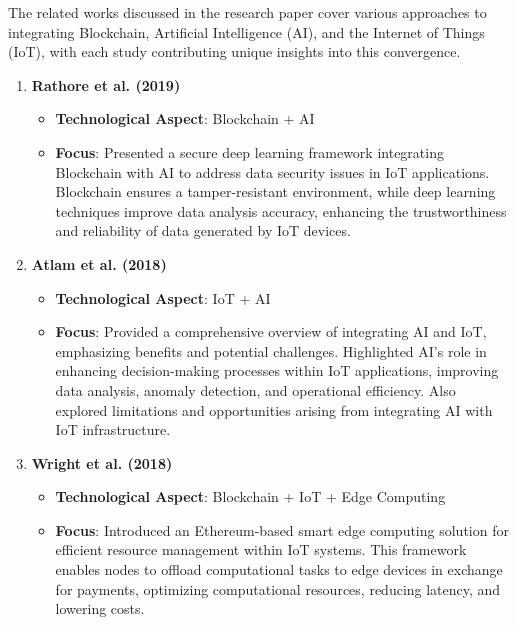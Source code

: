 \documentclass[12pt, oneside]{report}
\begin{document}
The related works discussed in the research paper cover various approaches to integrating Blockchain, Artificial Intelligence (AI), and the Internet of Things (IoT), with each study contributing unique insights into this convergence.

\begin{enumerate}
\item \textbf{Rathore et al. (2019)\cite{rathore2019}}
\begin{itemize}
    \item \textbf{Technological Aspect}: Blockchain + AI
    \item \textbf{Focus}: Presented a secure deep learning framework integrating Blockchain with AI to address data security issues in IoT applications. Blockchain ensures a tamper-resistant environment, while deep learning techniques improve data analysis accuracy, enhancing the trustworthiness and reliability of data generated by IoT devices.
\end{itemize}

\item \textbf{Atlam et al. (2018)\cite{atlam2018}}
\begin{itemize}
    \item \textbf{Technological Aspect}: IoT + AI
    \item \textbf{Focus}: Provided a comprehensive overview of integrating AI and IoT, emphasizing benefits and potential challenges. Highlighted AI's role in enhancing decision-making processes within IoT applications, improving data analysis, anomaly detection, and operational efficiency. Also explored limitations and opportunities arising from integrating AI with IoT infrastructure.
\end{itemize}

\item \textbf{Wright et al. (2018)\cite{wright2018}}
\begin{itemize}
    \item \textbf{Technological Aspect}: Blockchain + IoT + Edge Computing
    \item \textbf{Focus}: Introduced an Ethereum-based smart edge computing solution for efficient resource management within IoT systems. This framework enables nodes to offload computational tasks to edge devices in exchange for payments, optimizing computational resources, reducing latency, and lowering costs.
\end{itemize}


\end{enumerate}
\end{document}
